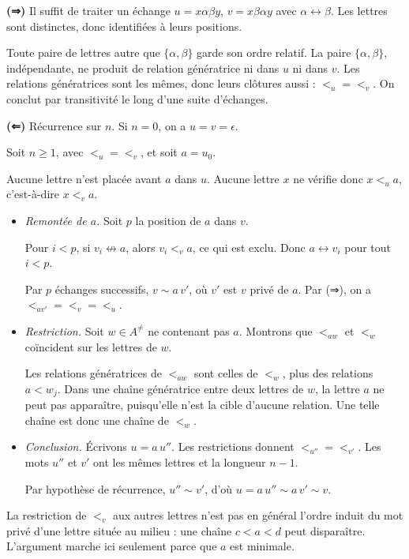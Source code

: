 \documentclass[11pt,a4paper]{article}
\newcommand{\equationajustee}[1]{%
  \sbox{\boiteequation}{$\displaystyle #1$}%
  \ifdim\wd\boiteequation>\linewidth
    \[\resizebox{\linewidth}{!}{\usebox{\boiteequation}}\]%
  \else
    \[#1\]%
  \fi}
\begin{document}
\textbf{(⇒)} Il suffit de traiter un échange \(u=x\alpha\beta y\), \(v=x\beta\alpha y\) avec \(\alpha\leftrightarrow\beta\). Les lettres sont distinctes, donc identifiées à leurs positions.

Toute paire de lettres autre que \(\{\alpha,\beta\}\) garde son ordre relatif. La paire \(\{\alpha,\beta\}\), indépendante, ne produit de relation génératrice ni dans \(u\) ni dans \(v\). Les relations génératrices sont les mêmes, donc leurs clôtures aussi : \(<_u=<_v\). On conclut par transitivité le long d'une suite d'échanges.

\textbf{(⇐)} Récurrence sur \(n\). Si \(n=0\), on a \(u=v=\epsilon\).

Soit \(n\ge1\), avec \(<_u=<_v\), et soit \(a=u_0\).

Aucune lettre n'est placée avant \(a\) dans \(u\). Aucune lettre \(x\) ne vérifie donc \(x<_ua\), c'est-à-dire \(x<_va\).

\begin{itemize}
\item
  \emph{Remontée de \(a\).} Soit \(p\) la position de \(a\) dans \(v\).

  Pour \(i<p\), si \(v_i\not\leftrightarrow a\), alors \(v_i<_va\), ce qui est exclu. Donc \(a\leftrightarrow v_i\) pour tout \(i<p\).

  Par \(p\) échanges successifs, \(v\sim a\,v'\), où \(v'\) est \(v\) privé de \(a\). Par (⇒), on a \(<_{av'}=<_v=<_u\).
\item
  \emph{Restriction.} Soit \(w\in A^{\neq}\) ne contenant pas \(a\). Montrons que \(<_{aw}\) et \(<_w\) coïncident sur les lettres de \(w\).

  Les relations génératrices de \(<_{aw}\) sont celles de \(<_w\), plus des relations \(a<w_j\). Dans une chaîne génératrice entre deux lettres de \(w\), la lettre \(a\) ne peut pas apparaître, puisqu'elle n'est la cible d'aucune relation. Une telle chaîne est donc une chaîne de \(<_w\).
\item
  \emph{Conclusion.} Écrivons \(u=a\,u''\). Les restrictions donnent \(<_{u''}=<_{v'}\). Les mots \(u''\) et \(v'\) ont les mêmes lettres et la longueur \(n-1\).

  Par hypothèse de récurrence, \(u''\sim v'\), d'où \(u=a\,u''\sim a\,v'\sim v\).
\end{itemize}

\equationajustee{\boxed{u\sim v\iff\ <_u\,=\,<_v}}

\begin{piege}

La restriction de \(<_v\) aux autres lettres n'est pas en général l'ordre induit du mot privé d'une lettre située au milieu : une chaîne \(c<a<d\) peut disparaître. L'argument marche ici seulement parce que \(a\) est minimale.

\end{piege}
\end{document}
